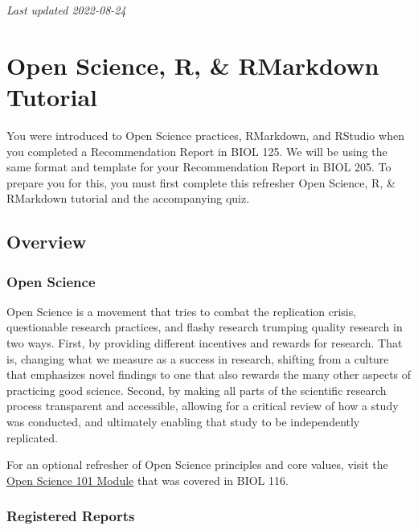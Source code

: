 \documentclass[
]{book}
\begin{document}
\emph{Last updated 2022-08-24}

\hypertarget{open-science-r-rmarkdown-tutorial}{%
\chapter*{Open Science, R, \& RMarkdown Tutorial}\label{open-science-r-rmarkdown-tutorial}}

You were introduced to Open Science practices, RMarkdown, and RStudio when you completed a Recommendation Report in BIOL 125. We will be using the same format and template for your Recommendation Report in BIOL 205. To prepare you for this, you must first complete this refresher Open Science, R, \& RMarkdown tutorial and the accompanying quiz.

\hypertarget{overview-1}{%
\section*{Overview}\label{overview-1}}

\hypertarget{open-science}{%
\subsection*{Open Science}\label{open-science}}

Open Science is a movement that tries to combat the replication crisis, questionable research practices, and flashy research trumping quality research in two ways. First, by providing different incentives and rewards for research. That is, changing what we measure as a success in research, shifting from a culture that emphasizes novel findings to one that also rewards the many other aspects of practicing good science. Second, by making all parts of the scientific research process transparent and accessible, allowing for a critical review of how a study was conducted, and ultimately enabling that study to be independently replicated.

For an optional refresher of Open Science principles and core values, visit the \href{https://ubco-biology.github.io/OS-Introduction/principles-of-open-science.html}{Open Science 101 Module} that was covered in BIOL 116.

\hypertarget{registered-reports}{%
\subsection*{Registered Reports}\label{registered-reports}}
\end{document}
